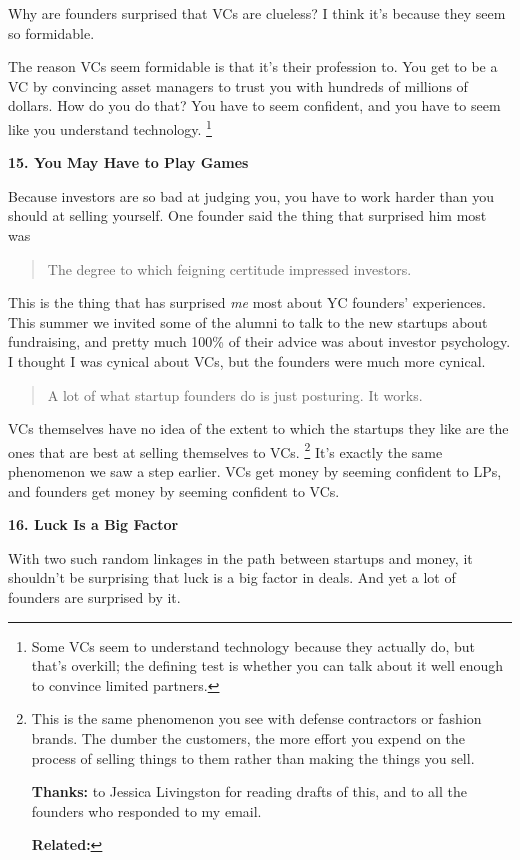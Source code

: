 Why are founders surprised that VCs are clueless? I think it's because
they seem so formidable.

The reason VCs seem formidable is that it's their profession to. You get
to be a VC by convincing asset managers to trust you with hundreds of
millions of dollars. How do you do that? You have to seem confident, and
you have to seem like you understand technology. \footnote{Some VCs seem to understand technology because they actually do,
but that's overkill; the defining test is whether you can talk about it
well enough to convince limited partners.}

\textbf{15. You May Have to Play Games}

Because investors are so bad at judging you, you have to work harder
than you should at selling yourself. One founder said the thing that
surprised him most was

\begin{quote}
The degree to which feigning certitude impressed investors.
\end{quote}

This is the thing that has surprised \emph{me} most about YC founders'
experiences. This summer we invited some of the alumni to talk to the
new startups about fundraising, and pretty much 100\% of their advice
was about investor psychology. I thought I was cynical about VCs, but
the founders were much more cynical.

\begin{quote}
A lot of what startup founders do is just posturing. It works.
\end{quote}

VCs themselves have no idea of the extent to which the startups they
like are the ones that are best at selling themselves to VCs.
\footnote{This is the same phenomenon you see with defense contractors or
fashion brands. The dumber the customers, the more effort you expend on
the process of selling things to them rather than making the things you
sell.

\textbf{Thanks:} to Jessica Livingston for reading drafts of this, and
to all the founders who responded to my email.

\textbf{Related:}} It's exactly the same phenomenon we saw a step
earlier. VCs get money by seeming confident to LPs, and founders get
money by seeming confident to VCs.

\textbf{16. Luck Is a Big Factor}

With two such random linkages in the path between startups and money, it
shouldn't be surprising that luck is a big factor in deals. And yet a
lot of founders are surprised by it.

